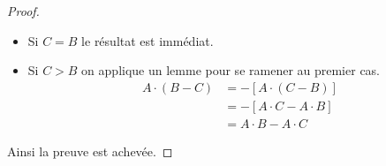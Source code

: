 \documentclass[french]{book}
\theoremstyle{plain}
\theoremstyle{definition}
\theoremstyle{remark}
\begin{document}
\begin{proof}
\begin{itemize}
\begin{itemize}
			\begin{align*}
				A \cdot (B-C) + A \cdot C &= A \cdot B + A \cdot (-C) + A \cdot C \\
				&= A \cdot B - A \cdot C + A \cdot C \\
				&= A \cdot B
			\end{align*}
			\item[--]Si $C = B$ le résultat est immédiat.
			\item[--]Si $C > B$ on applique un lemme pour se ramener au premier cas.
			\begin{align*}
				A \cdot (B-C) &= -[A \cdot (C-B)] \\
				&= -[A \cdot C - A \cdot B] \\
				&= A \cdot B - A \cdot C
			\end{align*}
		\end{itemize}
	\end{itemize}
	Ainsi la preuve est achevée.
\end{proof}
\end{document}
